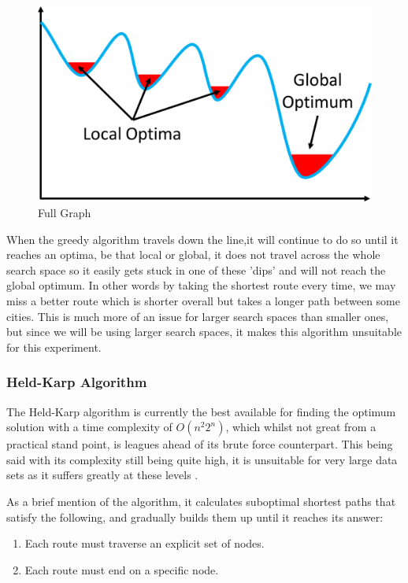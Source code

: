 \documentclass[11pt,a4paper,titlepage]{article}
\begin{document}
\begin{figure}[ht]
	\includegraphics[scale=0.3]{LocalGlobalOptima}
	\centering
	\caption{Full Graph}
\end{figure}

When the greedy algorithm travels down the line,it will continue to do so until it reaches an optima, be that local or global, it does not travel across the whole search space so it easily gets stuck in one of these 'dips' and will not reach the global optimum. In other words by taking the shortest route every time, we may miss a better route which is shorter overall but takes a longer path between some cities. This is much more of an issue for larger search spaces than smaller ones, but since we will be using larger search spaces, it makes this algorithm unsuitable for this experiment.

\subsubsection{Held-Karp Algorithm}
The Held-Karp algorithm is currently the best available for finding the optimum solution with a time complexity of $O(n^2 2^n)$, which whilst not great from a practical stand point, is leagues ahead of its brute force counterpart. This being said with its complexity still being quite high, it is unsuitable for very large data sets as it suffers greatly at these levels \cite{HeldKarpAlg}.

As a brief mention of the algorithm, it calculates suboptimal shortest paths that satisfy the following, and gradually builds them up until it reaches its answer:

\begin{enumerate}
\item Each route must traverse an explicit set of nodes.
\item Each route must end on a specific node.
\end{enumerate}
\end{document}
